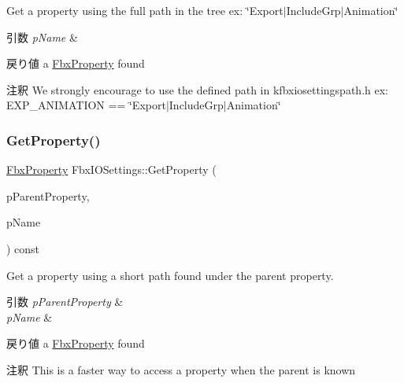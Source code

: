 Get a property using the full path in the tree ex\+: \char`\"{}\+Export$\vert$\+Include\+Grp$\vert$\+Animation\char`\"{} 
\begin{DoxyParams}{引数}
{\em p\+Name} & \\
\hline
\end{DoxyParams}
\begin{DoxyReturn}{戻り値}
a \hyperlink{class_fbx_property}{Fbx\+Property} found 
\end{DoxyReturn}
\begin{DoxyRemark}{注釈}
We strongly encourage to use the defined path in kfbxiosettingspath.\+h ex\+: E\+X\+P\+\_\+\+A\+N\+I\+M\+A\+T\+I\+ON == \char`\"{}\+Export$\vert$\+Include\+Grp$\vert$\+Animation\char`\"{} 
\end{DoxyRemark}
\mbox{\label{class_fbx_i_o_settings_aedc91a76523e1fb2fe015901afd5d8bc}} 
\subsubsection{\texorpdfstring{Get\+Property()}{GetProperty()}\hspace{0.1cm}{\footnotesize\ttfamily [2/2]}}
{\footnotesize\ttfamily \hyperlink{class_fbx_property}{Fbx\+Property} Fbx\+I\+O\+Settings\+::\+Get\+Property (\begin{DoxyParamCaption}\item[{const \hyperlink{class_fbx_property}{Fbx\+Property} \&}]{p\+Parent\+Property,  }\item[{const char $\ast$}]{p\+Name }\end{DoxyParamCaption}) const}

Get a property using a short path found under the parent property. 
\begin{DoxyParams}{引数}
{\em p\+Parent\+Property} & \\
\hline
{\em p\+Name} & \\
\hline
\end{DoxyParams}
\begin{DoxyReturn}{戻り値}
a \hyperlink{class_fbx_property}{Fbx\+Property} found 
\end{DoxyReturn}
\begin{DoxyRemark}{注釈}
This is a faster way to access a property when the parent is known 
\end{DoxyRemark}
\mbox{\label{class_fbx_i_o_settings_a04310e1fd32d0f8852eef9dae52aab54}} 
